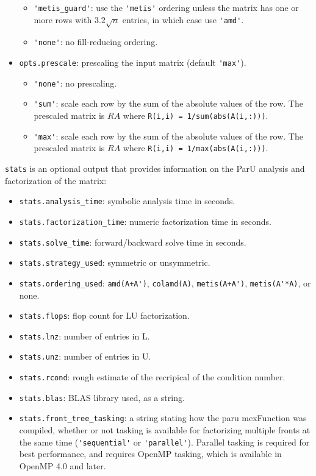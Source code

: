 \documentclass[12pt]{article}
\begin{document}
\begin{itemize}
\begin{itemize}
        \item \verb"'metis_guard'": use the \verb"'metis'" ordering unless the
        matrix has one or more rows with $3.2\sqrt{n}$ entries, in which case
        use \verb"'amd'".

        \item \verb"'none'": no fill-reducing ordering.

        \end{itemize}

    \item \verb'opts.prescale': prescaling the input matrix
        (default \verb"'max'").

        \begin{itemize}
        \item \verb"'none'": no prescaling.
        \item \verb"'sum'": scale each row by the sum of the absolute values
            of the row.  The prescaled matrix is $RA$ where
            \verb'R(i,i) = 1/sum(abs(A(i,:)))'.
        \item \verb"'max'": scale each row by the sum of the absolute values
            of the row.  The prescaled matrix is $RA$ where
            \verb'R(i,i) = 1/max(abs(A(i,:)))'.
        \end{itemize}

\end{itemize}

\verb'stats' is an optional output that provides information on the ParU
analysis and factorization of the matrix:

\begin{itemize}
    \item \verb'stats.analysis_time': symbolic analysis time in seconds.
    \item \verb'stats.factorization_time': numeric factorization time in
        seconds.
    \item \verb'stats.solve_time': forward/backward solve time in seconds.
    \item \verb'stats.strategy_used': symmetric or unsymmetric.
    \item \verb'stats.ordering_used':
        \verb"amd(A+A')", \verb"colamd(A)", \verb"metis(A+A')",
        \verb"metis(A'*A)", or none.
    \item \verb'stats.flops': flop count for LU factorization.
    \item \verb'stats.lnz': number of entries in L.
    \item \verb'stats.unz': number of entries in U.
    \item \verb'stats.rcond': rough estimate of the recripical of the condition
        number.
    \item \verb'stats.blas': BLAS library used, as a string.
    \item \verb'stats.front_tree_tasking': a string stating how the paru
    mexFunction was compiled, whether or not tasking is available for
    factorizing multiple fronts at the same time (\verb"'sequential'" or
    \verb"'parallel'").  Parallel tasking is required for best performance, and
    requires OpenMP tasking, which is available in OpenMP 4.0 and later.
\end{itemize}
\end{document}
